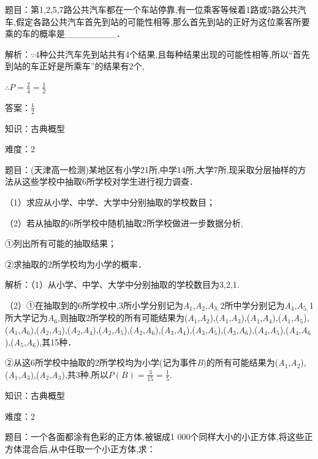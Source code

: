 \documentclass{article} %
\begin{document}
题目：第1,2,5,7路公共汽车都在一个车站停靠,有一位乘客等候着1路或5路公共汽车,假定各路公共汽车首先到站的可能性相等,那么首先到站的正好为这位乘客所要乘的车的概率是\_\_\_\_\_\_\_\_．

解析：$\mathrm{\because}$4种公共汽车先到站共有4个结果,且每种结果出现的可能性相等,所以``首先到站的车正好是所乘车''的结果有2个,

$\mathrm{\therefore} P=\frac{2}{4}=\frac{1}{2}$

答案：$\frac{1}{2}$

知识：古典概型

难度：2

题目：(天津高一检测)某地区有小学21所,中学14所,大学7所,现采取分层抽样的方法从这些学校中抽取6所学校对学生进行视力调查．

（1）求应从小学、中学、大学中分别抽取的学校数目；

（2）若从抽取的6所学校中随机抽取2所学校做进一步数据分析,

①列出所有可能的抽取结果；

②求抽取的2所学校均为小学的概率．

解析：（1）从小学、中学、大学中分别抽取的学校数目为3,2,1.

（2）①在抽取到的6所学校中,3所小学分别记为\textit{A}${}_{1}$,\textit{A}${}_{2}$,\textit{A}${}_{3,}$2所中学分别记为\textit{A}${}_{4}$,\textit{A}${}_{5,}$1所大学记为\textit{A}${}_{6}$,则抽取2所学校的所有可能结果为(\textit{A}${}_{1}$,\textit{A}${}_{2}$),(\textit{A}${}_{1}$,\textit{A}${}_{3}$),(\textit{A}${}_{1}$,\textit{A}${}_{4}$),(\textit{A}${}_{1}$,\textit{A}${}_{5}$),(\textit{A}${}_{1}$,\textit{A}${}_{6}$),(\textit{A}${}_{2}$,\textit{A}${}_{3}$),(\textit{A}${}_{2}$,\textit{A}${}_{4}$),(\textit{A}${}_{2}$,\textit{A}${}_{5}$),(\textit{A}${}_{2}$,\textit{A}${}_{6}$),(\textit{A}${}_{3}$,\textit{A}${}_{4}$),(\textit{A}${}_{3}$,\textit{A}${}_{5}$),(\textit{A}${}_{3}$,\textit{A}${}_{6}$),(\textit{A}${}_{4}$,\textit{A}${}_{5}$),(\textit{A}${}_{4}$,\textit{A}${}_{6}$),(\textit{A}${}_{5}$,\textit{A}${}_{6}$),其15种．

②从这6所学校中抽取的2所学校均为小学(记为事件\textit{B})的所有可能结果为(\textit{A}${}_{1}$,\textit{A}${}_{2}$),(\textit{A}${}_{1}$,\textit{A}${}_{3}$),(\textit{A}${}_{2}$,\textit{A}${}_{3}$),共3种,所以$P(B)=\frac{3}{15}=\frac{1}{5}$.

知识：古典概型

难度：2

题目：一个各面都涂有色彩的正方体,被锯成1 000个同样大小的小正方体,将这些正方体混合后,从中任取一个小正方体,求：
\end{document}
